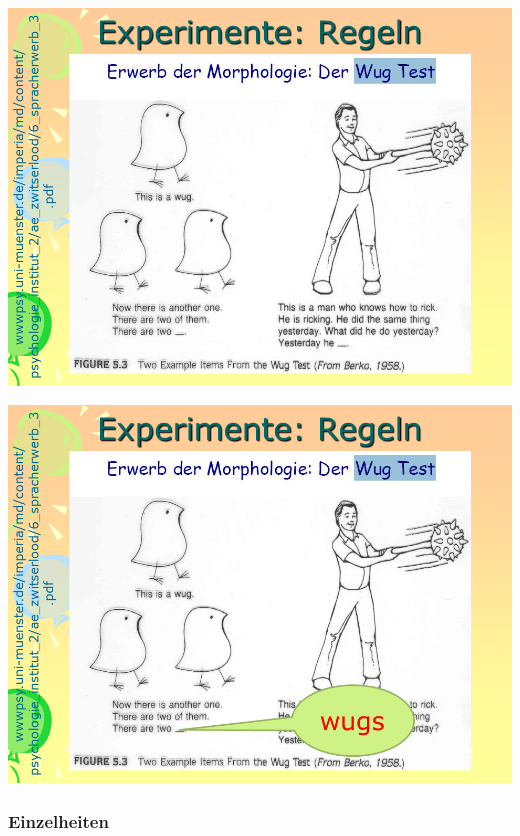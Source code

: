 \documentclass[
  letterpaper,
]{scrbook}
\begin{document}
\includegraphics[width=1\textwidth,height=\textheight]{./pictures/neuro/Diapozitiv49.PNG}

\includegraphics[width=1\textwidth,height=\textheight]{./pictures/neuro/Diapozitiv50.PNG}

\hypertarget{einzelheiten}{%
\subsubsection{Einzelheiten}\label{einzelheiten}}
\end{document}

